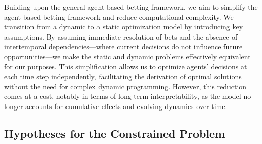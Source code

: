 Building upon the general agent-based betting framework, we aim to simplify the agent-based betting framework and reduce computational complexity. We transition from a dynamic to a static optimization model by introducing key assumptions. By assuming immediate resolution of bets and the absence of intertemporal dependencies—where current decisions do not influence future opportunities—we make the static and dynamic problems effectively equivalent for our purposes. This simplification allows us to optimize agents' decisions at each time step independently, facilitating the derivation of optimal solutions without the need for complex dynamic programming. However, this reduction comes at a cost, notably in terms of long-term interpretability, as the model no longer accounts for cumulative effects and evolving dynamics over time.

\subsection{Hypotheses for the Constrained Problem}

